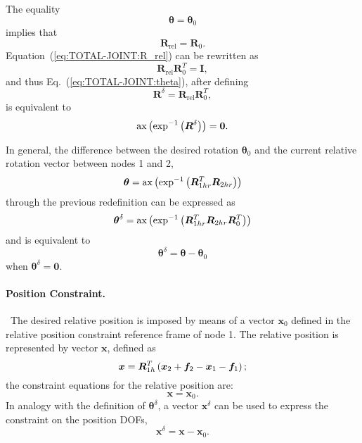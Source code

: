 \documentclass[10pt,dvips,fleqn,subeqn]{report}
\newcommand{\T}[1]{\bm{#1}}
\newcommand{\dofs}{DOFs}
\begin{document}
The equality
\begin{equation}
	\T{\theta} = \T{\theta}_0
	\label{eq:TOTAL-JOINT:theta}
\end{equation}
implies that
\begin{equation}
	\T{R}_{\mathrm{rel}} = \T{R}_0 .
	\label{eq:TOTAL-JOINT:R_rel}
\end{equation}
Equation~(\ref{eq:TOTAL-JOINT:R_rel}) can be rewritten as
\begin{equation}
	\T{R}_{\mathrm{rel}} \T{R}_0^T = \T{I} ,
\end{equation}
and thus Eq.~(\ref{eq:TOTAL-JOINT:theta}),
after defining
\begin{equation}
	\T{R}^{\delta} = \T{R}_{\text{rel}} \T{R}_0^T ,
	\label{eq:TOTAL-JOINT:R^delta}
\end{equation}
is equivalent to
\begin{equation}
	\llk{ax}\plbr{\exp^{-1}\plbr{\T{R}^{\delta}}} = \T{0} .
\end{equation}

\noindent
In general, the difference between the desired rotation
$\T{\theta}_0$ and the current relative rotation vector between
nodes 1 and 2,
\begin{equation}
	\T{\theta} = \llk{ax}\plbr{\exp^{-1}\plbr{
		\T{R}_{1hr}^T \T{R}_{2hr}
	}}
\end{equation}
through the previous redefinition can be expressed as
\begin{equation}
	\T{\theta}^{\delta} = \llk{ax}\plbr{\exp^{-1}\plbr{
		\T{R}_{1hr}^T \T{R}_{2hr} \T{R}_0^T
	}}
	\label{eq:TOTAL-JOINT:thetadelta}
\end{equation}
and is equivalent to
\begin{equation}
	\T{\theta}^{\delta} = \T{\theta} - \T{\theta}_0
\end{equation}
when $\T{\theta}^{\delta}=\T{0}$.

\paragraph{Position Constraint.} \
The desired relative position is imposed by means of a vector $\T{x}_0$
defined in the relative position constraint reference frame of node 1.
The relative position is represented by vector $\T{x}$, defined as
\begin{equation}
	\T{x} = \T{R}_{1h}^T\plbr{
		\T{x}_2 + \T{f}_2 - \T{x}_1 - \T{f}_1
	} ;
\end{equation}
the constraint equations for the relative position are:
\begin{equation}
	\T{x} = \T{x}_0 .
\end{equation}
In analogy with the definition of $\T{\theta}^{\delta}$, a vector
$\T{x}^{\delta}$ can be used to express the constraint
on the position \dofs,
\begin{equation}
	\T{x}^{\delta} = \T{x} - \T{x}_0 .
\end{equation}
\end{document}
